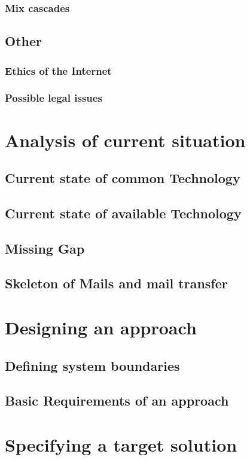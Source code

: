 \documentclass[11pt,a4paper]{book}
\begin{document}
\subsection{Mix cascades}
\section{Other}
\subsection{Ethics of the Internet}
\cite[p.~1]{RFC1087}
\subsection{Possible legal issues}

\chapter{Analysis of current situation\label{chap:analysis}}
\section{Current state of common Technology}
\section{Current state of available Technology}
\section{Missing Gap}
\section{Skeleton of Mails and mail transfer}


\chapter{Designing an approach}
\section{Defining system boundaries}
\section{Basic Requirements of an approach}

\chapter{Specifying a target solution}
\end{document}
